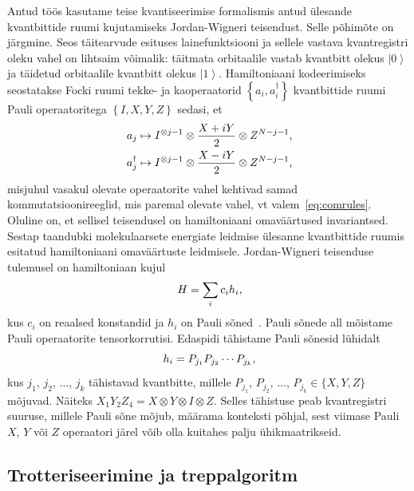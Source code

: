 \documentclass[12pt]{report}
\def\cparen#1{\left\{#1\right\}}
\def\ket#1{\left|#1\right>}
\begin{document}
Antud töös kasutame teise kvantiseerimise formalismis antud ülesande kvantbittide ruumi kujutamiseks Jordan-Wigneri teisendust.
Selle põhimõte on järgmine.
Seos täitearvude esituses lainefunktsiooni ja sellele vastava kvantregistri oleku vahel on lihtsaim võimalik: täitmata orbitaalile vastab kvantbitt olekus \(\ket{0}\) ja täidetud orbitaalile kvantbitt olekus \(\ket{1}\).
Hamiltoniaani kodeerimiseks seostatakse Focki ruumi tekke- ja kaoperaatorid \(\cparen{a_i, a_i^\dagger}\) kvantbittide ruumi Pauli operaatoritega \(\cparen{I, X, Y, Z}\) sedasi, et
\begin{align}
    a_j &\mapsto I^{\otimes j-1} \otimes \frac{X+iY}{2} \otimes Z^{N-j-1} \rlap{,} \\
    a_j^\dagger &\mapsto I^{\otimes j-1} \otimes \frac{X-iY}{2} \otimes Z^{N-j-1} \rlap{,}
\end{align}
misjuhul vasakul olevate operaatorite vahel kehtivad samad kommutatsioonireeglid, mis paremal olevate vahel, vt valem~\eqref{eq:comrules}.
Oluline on, et sellisel teisendusel on hamiltoniaani omaväärtused invariantsed.
Sestap taandubki molekulaarsete energiate leidmise ülesanne kvantbittide ruumis esitatud hamiltoniaani omaväärtuste leidmisele.
Jordan-Wigneri teisenduse tulemusel on hamiltoniaan kujul
\begin{align}\label{eq:paulisum}
    H = \sum_i c_i h_i \rlap{,}
\end{align}
kus \(c_i\) on reaalsed konstandid ja \(h_i\) on Pauli sõned~\cite{whitfield+etal2011, mcardle+etal}.
Pauli sõnede all mõistame Pauli operaatorite tensorkorrutisi.
Edaspidi tähistame Pauli sõnesid lühidalt
\begin{equation} h_i=P_{j_1}P_{j_2}\cdots P_{j_k} \rlap{,}\end{equation}
kus \(j_1\), \(j_2\), $\ldots$, \(j_k\) tähistavad kvantbitte, millele \(P_{j_1}\), \(P_{j_2}\), \(\ldots\), \(P_{j_k}\in\{X,Y,Z\}\) mõjuvad.
Näiteks \(X_1Y_2Z_4=X\otimes Y\otimes I\otimes Z.\)
Selles tähistuse peab kvantregistri suuruse, millele Pauli sõne mõjub, määrama konteksti põhjal, sest viimase Pauli \(X\), \(Y\) või \(Z\) operaatori järel võib olla kuitahes palju ühikmaatrikseid.

\subsection{Trotteriseerimine ja treppalgoritm}\label{sec:qcirc}
\end{document}
